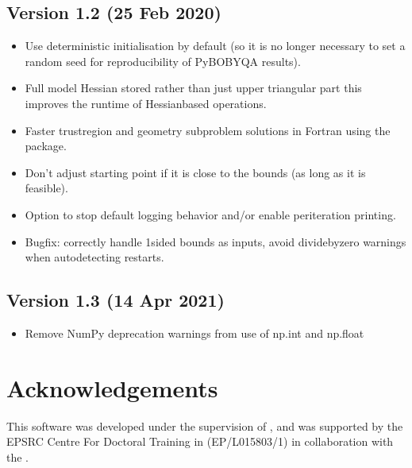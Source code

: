 \documentclass[letterpaper,10pt,english]{sphinxmanual}
\begin{document}
\section{Version 1.2 (25 Feb 2020)}
\label{\detokenize{history:version-1-2-25-feb-2020}}\begin{itemize}
\item {} 
Use deterministic initialisation by default (so it is no longer necessary to set a random seed for reproducibility of Py\sphinxhyphen{}BOBYQA results).

\item {} 
Full model Hessian stored rather than just upper triangular part \sphinxhyphen{} this improves the runtime of Hessian\sphinxhyphen{}based operations.

\item {} 
Faster trust\sphinxhyphen{}region and geometry subproblem solutions in Fortran using the  package.

\item {} 
Don’t adjust starting point if it is close to the bounds (as long as it is feasible).

\item {} 
Option to stop default logging behavior and/or enable per\sphinxhyphen{}iteration printing.

\item {} 
Bugfix: correctly handle 1\sphinxhyphen{}sided bounds as inputs, avoid divide\sphinxhyphen{}by\sphinxhyphen{}zero warnings when auto\sphinxhyphen{}detecting restarts.

\end{itemize}


\section{Version 1.3 (14 Apr 2021)}
\label{\detokenize{history:version-1-3-14-apr-2021}}\begin{itemize}
\item {} 
Remove NumPy deprecation warnings from use of np.int and np.float

\end{itemize}


\chapter{Acknowledgements}
\label{\detokenize{index:acknowledgements}}
This software was developed under the supervision of , and was supported by the EPSRC Centre For Doctoral Training in  (EP/L015803/1) in collaboration with the .
\end{document}
